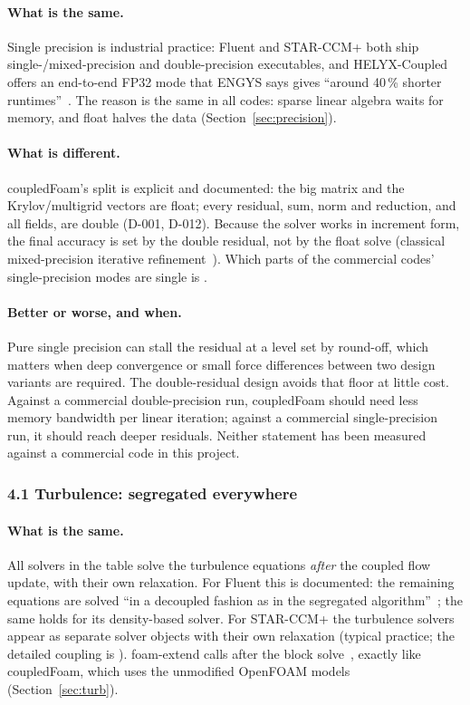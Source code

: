 \paragraph{What is the same.} Single precision is industrial practice:
Fluent and STAR-CCM+ both ship single-/mixed-precision and double-precision
executables, and HELYX-Coupled offers an end-to-end FP32 mode that ENGYS
says gives ``around 40\,\% shorter runtimes''~\cite{cmp-HelyxTechniques}.
The reason is the same in all codes: sparse linear algebra waits for
memory, and float halves the data (Section~\ref{sec:precision}).

\paragraph{What is different.} coupledFoam's split is explicit and
documented: the big matrix and the Krylov/multigrid vectors are float;
every residual, sum, norm and reduction, and all fields, are double
(D-001, D-012). Because the solver works in increment form, the final
accuracy is set by the double residual, not by the float solve (classical
mixed-precision iterative refinement~\cite{Baboulin2009,Carson2018}). Which
parts of the commercial codes' single-precision modes are single is
\cmpnpd.

\paragraph{Better or worse, and when.} Pure single precision can stall the
residual at a level set by round-off, which matters when deep convergence
or small force differences between two design variants are required. The
double-residual design avoids that floor at little cost. Against a
commercial double-precision run, coupledFoam should need less memory
bandwidth per linear iteration; against a commercial single-precision run,
it should reach deeper residuals. Neither statement has been measured
against a commercial code in this project.

\subsubsection*{4.1 Turbulence: segregated everywhere}

\paragraph{What is the same.} All solvers in the table solve the
turbulence equations \emph{after} the coupled flow update, with their own
relaxation. For Fluent this is documented: the remaining equations are
solved ``in a decoupled fashion as in the segregated
algorithm''~\cite{cmp-Fluent12TG}; the same holds for its density-based
solver. For STAR-CCM+ the turbulence solvers appear as separate solver
objects with their own relaxation (typical practice; the detailed coupling
is \cmpnpd). foam-extend  calls
 after the block solve~\cite{cmp-Jareteg2015},
exactly like coupledFoam, which uses the unmodified OpenFOAM models
(Section~\ref{sec:turb}).

